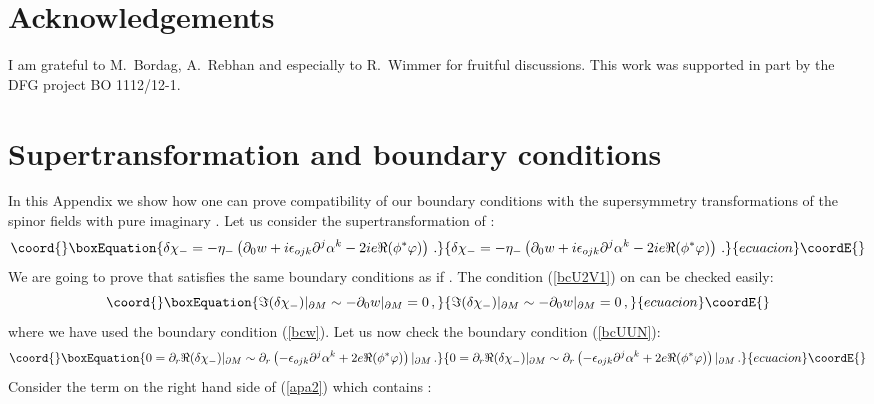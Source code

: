 \documentclass[a4paper,12pt]{article}
\begin{document}
\section*{Acknowledgements}
I am grateful to M.~Bordag, A.~Rebhan and especially to R.~Wimmer
for fruitful discussions.
This work was supported in part by the DFG project BO 1112/12-1.
\appendix
\section{Supertransformation and boundary conditions}\label{susyapp}
In this Appendix we show how one can prove compatibility
of our boundary conditions with the supersymmetry transformations
of the spinor fields with pure imaginary \myHighlight{$\eta_-$}\coordHE{}.
Let us consider the supertransformation of \myHighlight{$\chi_-$}\coordHE{}:
\begin{equation}\coord{}\boxEquation{
\delta \chi_-=-\eta_- \left( \partial_0 w +i\epsilon_{ojk}
\partial^j \alpha^k -2i e \Re ( \phi^* \varphi ) \right) \,.
\label{delchim}
}{
\delta \chi_-=-\eta_- \left( \partial_0 w +i\epsilon_{ojk}
\partial^j \alpha^k -2i e \Re ( \phi^* \varphi ) \right) \,.
}{ecuacion}\coordE{}\end{equation}
We are going to prove that \myHighlight{$\delta \chi_-$}\coordHE{} satisfies the same
boundary conditions as \myHighlight{$\chi_-$}\coordHE{} if \coordHE{}. The condition
(\ref{bcU2V1}) on \coordHE{} can be checked easily:
\begin{equation}\coord{}\boxEquation{
\Im (\delta \chi_-) |_{\partial M} \sim -\partial_0 w |_{\partial
M}=0 \,,\label{apa1}
}{
\Im (\delta \chi_-) |_{\partial M} \sim -\partial_0 w |_{\partial
M}=0 \,,}{ecuacion}\coordE{}\end{equation}
where we have used the boundary condition (\ref{bcw}). Let us now
check the boundary condition (\ref{bcUUN}):
\begin{equation}\coord{}\boxEquation{
0=\partial_r \Re (\delta \chi_-)|_{\partial M} \sim
\partial_r \left( -\epsilon_{ojk}
\partial^j \alpha^k + 2e \Re ( \phi^* \varphi ) \right)|_{\partial M}
\,.\label{apa2}
}{
0=\partial_r \Re (\delta \chi_-)|_{\partial M} \sim
\partial_r \left( -\epsilon_{ojk}
\partial^j \alpha^k + 2e \Re ( \phi^* \varphi ) \right)|_{\partial M}
\,.}{ecuacion}\coordE{}\end{equation}
Consider the term on the right hand side of (\ref{apa2}) which
contains \myHighlight{$\alpha$}\coordHE{}:
\end{document}
